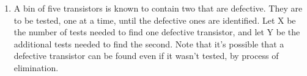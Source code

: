 \documentclass{article}
\begin{document}
\begin{enumerate}
\begin{enumerate}
\begin{align*}
                             &= \int^{w}_{0} e^{-x} - e^{-x+x-w} dx \\
                             &= \int^{w}_{0} e^{-x} - e^{-w} dx \\
                             &= -e^{-x} - xe^{-w} \rvert^{w}_{0} \\
                             &= -e^{-w} - we^{-w} - (-1 - 0) \\
                             &= -e^{-w} - we^{-w} + 1
            \end{align*}
        \clearpage
        \item   Use (b) to find the pdf of W.
            \\Answer:
            \begin{align*}
                f_{W}(w) &= -e^{-w} - we^{-w} + 1dx \\
                         &= e^{-w} - (e^{-w} + (-we^{-w}) \\
                         &= e^{-w} + we^{-w} - e^{-w} \\
                         &= we^{-w}
            \end{align*}
    \end{enumerate}

    \item   A bin of five transistors is known to contain two that are defective. They are to be tested, one at a time, 
            until the defective ones are identified. Let X be the number of tests needed to find one defective
            transistor, and let Y be the additional tests needed to find the second. Note that it's possible that a defective
            transistor can be found even if it wasn't tested, by process of elimination.


\end{enumerate}
\end{document}
